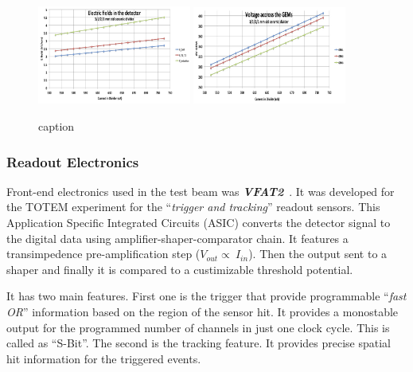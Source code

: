 \begin{figure}[htbp]
    \centering
    \includegraphics[width=0.45\textwidth]{figures/GEM/GE11_IV_ElectricField_detector.jpeg}%
    \includegraphics[width=0.45\textwidth]{figures/GEM/GE11_IV_VoltageAcross_GEM.jpeg}
    \caption{caption}
    \label{fig:GEM_voltage_electricfield}
\end{figure}

\subsubsection{Readout Electronics} %
\label{ssub:readout_electronics}
Front-end electronics used in the test beam was \textbf{\textit{VFAT2}}~\cite{Aspell2007,Berardi2004}. It was developed for the TOTEM experiment for the ``\textit{trigger and tracking}'' readout sensors.
This Application Specific Integrated Circuits (ASIC) converts the detector signal to the digital data using amplifier-shaper-comparator chain.
It features a transimpedence pre-amplification step ($V_{out} \propto ~ I_{in}$). Then the output sent to a shaper and finally it is compared to a custimizable threshold potential.

It has two main features. First one is the trigger that provide programmable ``\textit{fast OR}'' information based on the region of the sensor hit. It provides a monostable output for the programmed number of channels in just one clock cycle. This is called as ``S-Bit''. The second is the tracking feature. It provides precise spatial hit information for the triggered events. 

